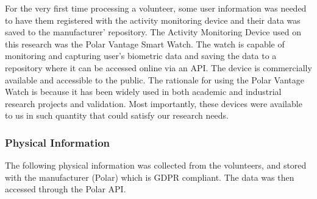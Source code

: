 For the very first time processing a volunteer, some user information was needed to have them registered with the activity monitoring device and their data was saved to the manufacturer'
repository. The Activity Monitoring Device used on this research was the Polar Vantage Smart Watch. The watch is capable of monitoring and capturing user’s biometric data and saving the
data to a repository where it can be accessed online via an API. The device is commercially available and accessible to the public. The rationale for using the Polar Vantage Watch is
because it has been widely used in both academic and industrial research projects and validation. Most importantly, these devices were available to us in such quantity that could satisfy
our research needs.

\subsubsection*{Physical Information}

The following physical information was collected from the volunteers, and stored with the manufacturer (Polar) which is GDPR compliant. The data was then accessed through the Polar API.

